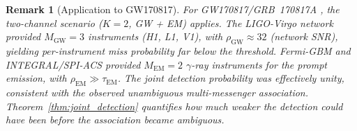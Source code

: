 \documentclass[11pt,a4paper]{article}
\newtheorem{remark}[theorem]{Remark}
\theoremstyle{definition}
\begin{document}
\begin{remark}[Application to GW170817]
For GW170817/GRB~170817A \cite{GW170817}, the two-channel scenario ($K=2$, GW + EM) applies. The LIGO-Virgo network provided $M_{\mathrm{GW}} = 3$ instruments (H1, L1, V1), with $\rho_{\mathrm{GW}} \approx 32$ (network SNR), yielding per-instrument miss probability far below the threshold. Fermi-GBM and INTEGRAL/SPI-ACS provided $M_{\mathrm{EM}} = 2$ $\gamma$-ray instruments for the prompt emission, with $\rho_{\mathrm{EM}} \gg \tau_{\mathrm{EM}}$. The joint detection probability was effectively unity, consistent with the observed unambiguous multi-messenger association. Theorem~\ref{thm:joint_detection} quantifies \emph{how much} weaker the detection could have been before the association became ambiguous.
\end{remark}
\end{document}
